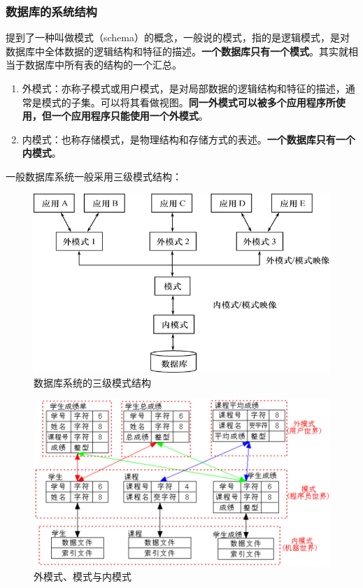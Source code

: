 \documentclass[main.tex]{subfiles}
\begin{document}
\subsubsection{数据库的系统结构}
提到了一种叫做模式（schema）的概念，一般说的模式，指的是逻辑模式，是对数据库中全体数据的逻辑结构和特征的描述。{\bfseries 一个数据库只有一个模式}。其实就相当于数据库中所有表的结构的一个汇总。\\
\begin{enumerate}
    \item 外模式：亦称子模式或用户模式，是对局部数据的逻辑结构和特征的描述，通常是模式的子集。可以将其看做视图。{\bfseries 同一外模式可以被多个应用程序所使用，但一个应用程序只能使用一个外模式}。
    \item 内模式：也称存储模式，是物理结构和存储方式的表述。{\bfseries 一个数据库只有一个内模式}。
\end{enumerate}
一般数据库系统一般采用三级模式结构：
\begin{figure}[H]
    \centering
    \includegraphics[scale=0.5]{./images/0023.png}
    \caption{数据库系统的三级模式结构}
\end{figure}
\begin{figure}[H]
    \centering
    \includegraphics[scale=0.5]{./images/0024.png}
    \caption{外模式、模式与内模式}
\end{figure}
\end{document}
